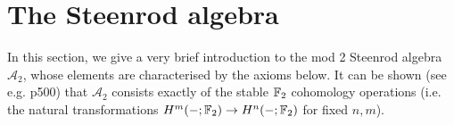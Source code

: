 \documentclass[11pt, titlepage]{article} %
\def\bb{\ensuremath\mathbb}
\def\subq{\ensuremath\subseteq}
\def\inj{\ensuremath\hookrightarrow}
\def\del{\ensuremath\partial}
\def\A{\ensuremath{\mathscr{A}_2}}
\numberwithin{equation}{subsection}
\theoremstyle{plain}
\theoremstyle{definition}
\begin{document}


\section{The Steenrod algebra}\label{2503221247}

In this section, we give a very brief introduction to the mod 2 Steenrod algebra \(\A\), whose elements are characterised by the axioms below. It can be shown (see e.g. \autocite{hatcher} p500) that \(\A\) consists exactly of the stable \(\bb{F}_2\) cohomology operations (i.e. the natural transformations \(H^m(-;\bb{F}_2)\to H^n(-; \bb{F}_2)\) for fixed \(n,m\)). 
\end{document}
